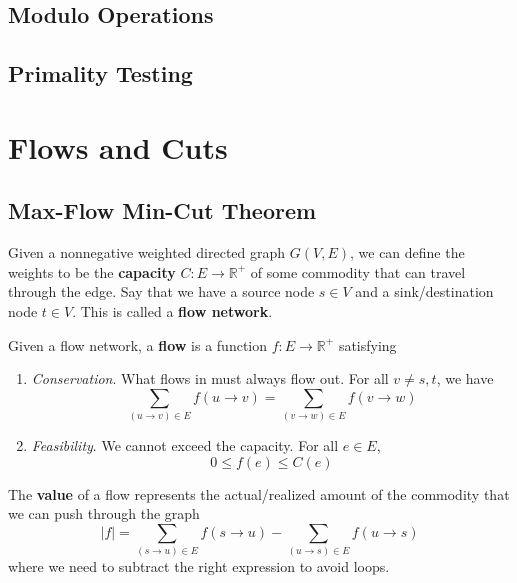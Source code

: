 \documentclass{article}
\begin{document}
  \subsection{Modulo Operations}

  \subsection{Primality Testing}

\section{Flows and Cuts} 

  \subsection{Max-Flow Min-Cut Theorem} 

    \begin{definition}
      Given a nonnegative weighted directed graph $G(V, E)$, we can define the weights to be the \textbf{capacity} $C: E \rightarrow \mathbb{R}^+$ of some commodity that can travel through the edge. Say that we have a source node $s \in V$ and a sink/destination node $t \in V$. This is called a \textbf{flow network}.
    \end{definition}

    \begin{definition}[Flow]
      Given a flow network, a \textbf{flow} is a function $f: E \rightarrow \mathbb{R}^+$ satisfying 
      \begin{enumerate}
        \item \textit{Conservation}. What flows in must always flow out. For all $v \neq s, t$, we have 
          \begin{equation}
            \sum_{(u \rightarrow v) \in E} f(u \rightarrow v) = \sum_{(v \rightarrow w) \in E} f(v \rightarrow w)
          \end{equation}

        \item \textit{Feasibility}. We cannot exceed the capacity. For all $e \in E$, 
          \begin{equation}
            0 \leq f(e) \leq C(e)
          \end{equation}
      \end{enumerate}
      The \textbf{value} of a flow represents the actual/realized amount of the commodity that we can push through the graph
      \begin{equation}
        |f| = \sum_{(s \rightarrow u) \in E}  f(s \rightarrow u) - \sum_{(u \rightarrow s) \in E}  f(u \rightarrow s) 
      \end{equation} 
      where we need to subtract the right expression to avoid loops. 
    \end{definition}
\end{document}

